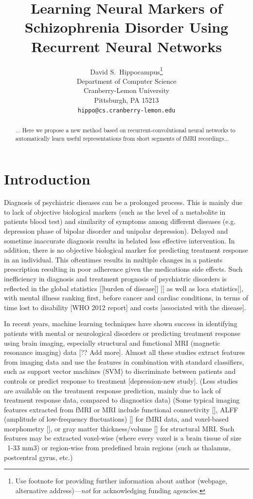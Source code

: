 \documentclass{article}
\title{Learning Neural Markers of Schizophrenia Disorder Using Recurrent Neural Networks}
\author{
  David S.~Hippocampus\thanks{Use footnote for providing further
    information about author (webpage, alternative
    address)---\emph{not} for acknowledging funding agencies.} \\
  Department of Computer Science\\
  Cranberry-Lemon University\\
  Pittsburgh, PA 15213 \\
  \texttt{hippo@cs.cranberry-lemon.edu} \\
}
\begin{document}

\maketitle

\begin{abstract}

... Here we propose a new method based on recurrent-convolutional neural networks to automatically learn useful representations from short segments of fMRI recordings...

\end{abstract}

\section{Introduction}

Diagnosis of psychiatric diseases can be a prolonged process. This is mainly due to lack of objective biological markers (such as the level of a metabolite in patients blood test) and similarity of symptoms among different diseases (e.g. depression phase of bipolar disorder and unipolar depression). Delayed and sometime inaccurate diagnosis results in belated less effective intervention. In addition, there is no objective biological marker for predicting treatment response in an individual. This oftentimes results in multiple changes in a patients prescription resulting in poor adherence given the medications side effects. Such inefficiency in diagnosis and treatment prognosis of psychiatric disorders is reflected in the global statistics [[burden of disease]] [[ as well as loca statistics]], with mental illness ranking first, before cancer and cardiac conditions, in terms of time lost to disability [WHO 2012 report] and costs \citep{Roehrig2016} [associated with the disease].

In recent years, machine learning techniques have shown success in identifying patients with mental or neurological disorders or predicting treatment response using brain imaging, especially structural and functional MRI (magnetic resonance imaging) data \citep{Gheiratmand2017, Orru2012} [?? Add more]. Almost all these studies extract features from imaging data and use the features in combination with standard classifiers, such as support vector machines (SVM) \citep{Orru2012, Wolfers2015} to discriminate between patients and controls or predict response to treatment [depression-new study]. (Less studies are available on the treatment response prediction, mainly due to lack of treatment response data, compared to diagnostics data) (Some typical imaging features extracted from fMRI or MRI include functional connectivity [], ALFF (amplitude of low-frequency fluctuations) [] for fMRI data, and voxel-based morphometry [], or gray matter thickness/volume [] for structural MRI. Such features may be extracted voxel-wise (where every voxel is a brain tissue of size ~1-33 mm3) or region-wise from predefined brain regions (such as thalamus, postcentral gyrus, etc.)
\end{document}
